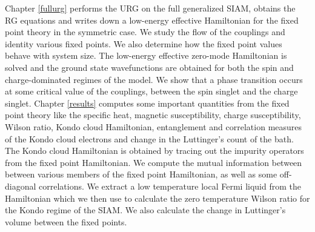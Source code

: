 \documentclass[12pt,twoside]{report}
\numberwithin{equation}{section}
\begin{document}
\pb Chapter \ref{fullurg} performs the URG on the full generalized SIAM, obtains the RG equations and writes down a low-energy effective Hamiltonian for the fixed point theory in the symmetric case. We study the flow of the couplings and identity various fixed points. We also determine how the fixed point values behave with system size. The low-energy effective zero-mode Hamiltonian is solved and the ground state wavefunctions are obtained for both the spin and charge-dominated regimes of the model. We show that a phase transition occurs at some critical value of the couplings, between the spin singlet and the charge singlet.
\pb Chapter \ref{results} computes some important quantities from the fixed point theory like the specific heat, magnetic susceptibility, charge susceptibility, Wilson ratio, Kondo cloud Hamiltonian, entanglement and correlation measures of the Kondo cloud electrons and change in the Luttinger's count of the bath.  The Kondo cloud Hamiltonian is obtained by tracing out the impurity operators from the fixed point Hamiltonian. We compute the mutual information between between various members of the fixed point Hamiltonian, as well as some off-diagonal correlations. We extract a low temperature local Fermi liquid from the Hamiltonian which we then use to calculate the zero temperature Wilson ratio for the Kondo regime of the SIAM. We also calculate the change in Luttinger's volume between the fixed points.
\end{document}

